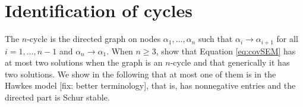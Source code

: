 \documentclass[accepted]{uai2021} %
\begin{document}
\begin{comment}
	can be computed from $\bar{C}$ and it holds that 
	$C^+=\bar{C}_{OO}$. By direct computation, we see that $\Gamma_{43} = 
	C_{14}^+/C_{13}^+$. To obtain a constraint, we find a second method of 
	identification of $\Gamma_{43}$ by noting that
	
	\begin{align}
		\Theta = (I - \Gamma)\bar{C}(I-\Gamma)^T = \bar{C} - 
		\Gamma\bar{C} - \bar{C}\Gamma^T + 
		\Gamma\bar{C}\Gamma^T,
		\label{eq:expandTheta}
	\end{align}

	
	assuming that $\Gamma$ is weakly stable. By considering the 
	$(3,4)$-entry of the above matrix equation,
	
	$$
	\Gamma_{43} = (\bar{C}_{34} - 
	\Gamma_{32}\bar{C}_{24})/(\bar{C}_{33} - 
	\Gamma_{32}\bar{C}_{23}).
	$$
	
 Again, we obtained two ways of identifying 
 the parameter $\Gamma_{43}$, that is, a constraint
 
 $$
 C_{14}^+/C_{13}^+ = (\bar{C}_{34} - 
 \Gamma_{32}\bar{C}_{24})/(\bar{C}_{33} - 
 \Gamma_{32}\bar{C}_{23})
 $$
 
 using that $\Gamma_{32} = {\Phi}_{32}/(1-\Phi_{33})$ is known as 
 ${\Phi}_{32}$ and 
 ${\Phi}_{33}$ are known. This constraint is satisfied in 
 Figure
 \ref{fig:bigCycle}\textbf{A}, 
 but not in \ref{fig:bigCycle}\textbf{B}, and it allows us to 
 distinguish between 
 the two.
 
 \label{exmp:eqBigCycle}
\end{exmp}


\end{comment}


\section{Identification of cycles}

The $n$-cycle is the directed graph on nodes $\alpha_1,\ldots,\alpha_n$ such 
that $\alpha_i \rightarrow \alpha_{i+1}$ for all $i = 1,\ldots,n-1$ and 
$\alpha_n\rightarrow \alpha_1$. When $n \geq 3$, \cite{drton2011} show that 
Equation \ref{eq:covSEM} has at 
most two solutions when the graph is an $n$-cycle and that generically it has 
two solutions. We show in the following that at most one of them is in the 
Hawkes model [fix: better terminology], that is, has nonnegative entries and 
the directed part is Schur stable. 
\end{document}
